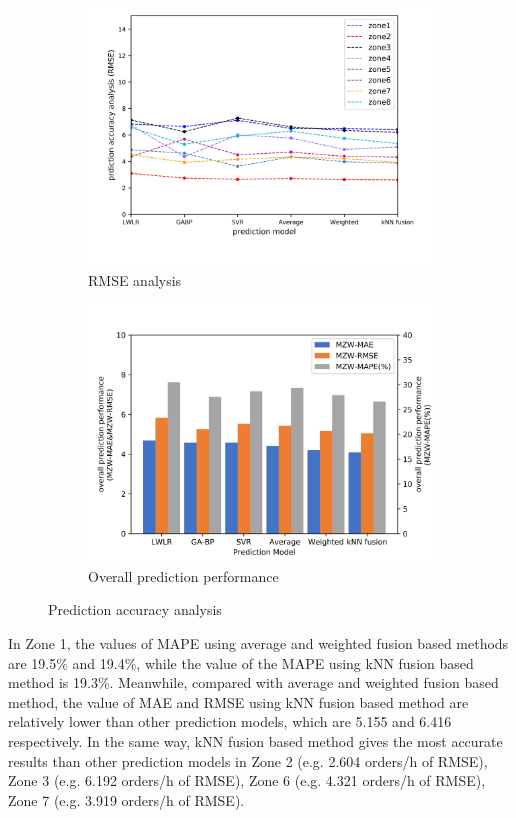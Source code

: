\documentclass[sigconf]{acmart}
\begin{document}
\begin{figure}
  \medskip
  \begin{subfigure}{.5\textwidth}
    \centering
    \includegraphics[width=.8\linewidth]{RMSE}  
    \caption{RMSE analysis}
    \label{fig:sub-third}
  \end{subfigure}\hfil
  \begin{subfigure}{.5\textwidth}
    \centering
    \includegraphics[width=.8\linewidth]{all}  
    \caption{Overall prediction performance}
    \label{fig:sub-fourth}
  \end{subfigure}
  \caption{Prediction accuracy analysis}
  \end{figure}
In Zone 1, the values of MAPE using average and weighted fusion based methods are 19.5\% and 19.4\%, while the value of the MAPE using kNN fusion based method is 19.3\%. Meanwhile, compared with average and weighted fusion based method, the value of MAE and RMSE using kNN fusion based method are relatively lower than other prediction models, which are 5.155 and 6.416 respectively. In the same way, kNN fusion based method gives the most accurate results than other prediction models in Zone 2 (e.g. 2.604 orders/h of RMSE), Zone 3 (e.g. 6.192 orders/h of RMSE), Zone 6 (e.g. 4.321 orders/h of RMSE), Zone 7 (e.g. 3.919 orders/h of RMSE). 
\end{document}
